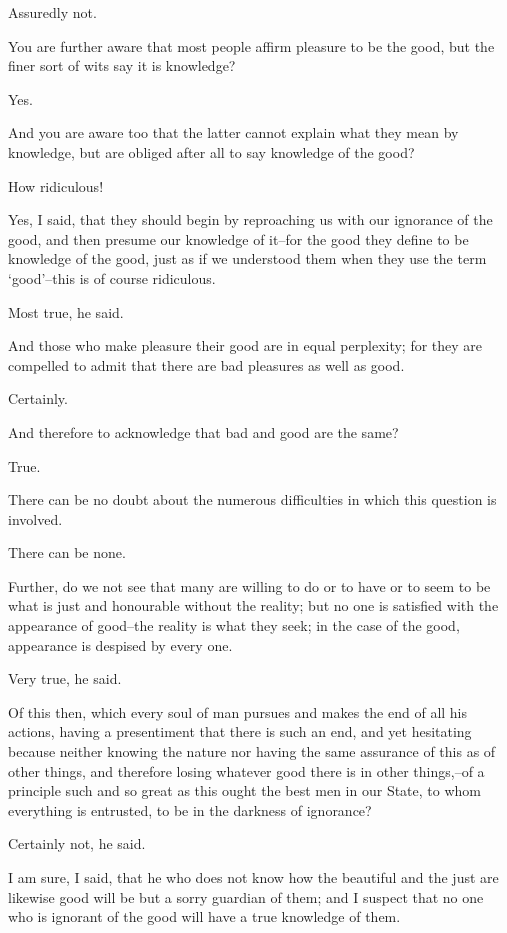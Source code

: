 Assuredly not.

You are further aware that most people affirm pleasure to be the good,
but the finer sort of wits say it is knowledge?

Yes.

And you are aware too that the latter cannot explain what they mean by
knowledge, but are obliged after all to say knowledge of the good?

How ridiculous!

Yes, I said, that they should begin by reproaching us with our ignorance
of the good, and then presume our knowledge of it--for the good they
define to be knowledge of the good, just as if we understood them when
they use the term `good'--this is of course ridiculous.

Most true, he said.

And those who make pleasure their good are in equal perplexity; for they
are compelled to admit that there are bad pleasures as well as good.

Certainly.

And therefore to acknowledge that bad and good are the same?

True.

There can be no doubt about the numerous difficulties in which this
question is involved.

There can be none.

Further, do we not see that many are willing to do or to have or to seem
to be what is just and honourable without the reality; but no one is
satisfied with the appearance of good--the reality is what they seek; in
the case of the good, appearance is despised by every one.

Very true, he said.

Of this then, which every soul of man pursues and makes the end of all
his actions, having a presentiment that there is such an end, and
yet hesitating because neither knowing the nature nor having the same
assurance of this as of other things, and therefore losing whatever
good there is in other things,--of a principle such and so great as this
ought the best men in our State, to whom everything is entrusted, to be
in the darkness of ignorance?

Certainly not, he said.

I am sure, I said, that he who does not know how the beautiful and
the just are likewise good will be but a sorry guardian of them; and
I suspect that no one who is ignorant of the good will have a true
knowledge of them.


